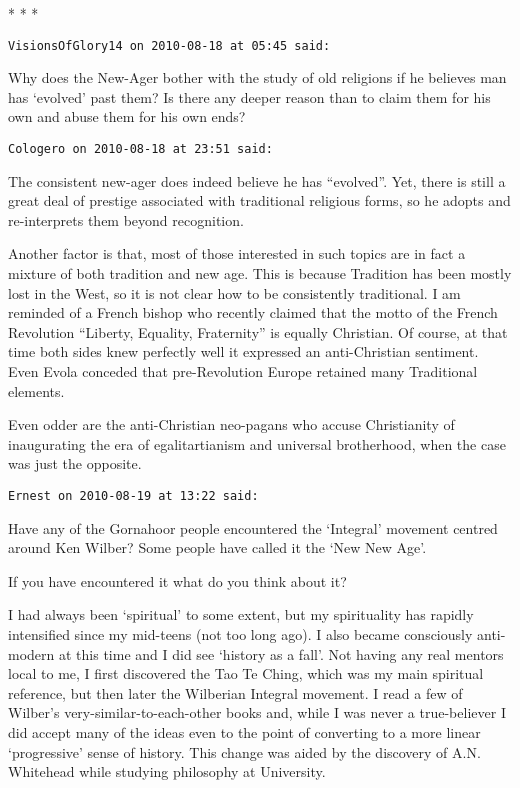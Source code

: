 \begin{center}* * *\end{center}

\begin{footnotesize}\begin{sffamily}

\texttt{VisionsOfGlory14 on 2010-08-18 at 05:45 said: }

Why does the New-Ager bother with the study of old religions if he believes man has ‘evolved’
past them? Is there any deeper reason than to claim them for his own and abuse them for his own ends?


\hfill

\texttt{Cologero on 2010-08-18 at 23:51 said: }

The consistent new-ager does indeed believe he has “evolved”. Yet, there is still a great deal of prestige associated
with traditional religious forms, so he adopts and re-interprets them beyond recognition.

Another factor is that, most of those interested in such topics are in fact a mixture of both tradition and new age.
This is because Tradition has been mostly lost in the West, so it is not clear how to be consistently traditional. I am
reminded of a French bishop who recently claimed that the motto of the French Revolution “Liberty, Equality,
Fraternity” is equally Christian. Of course, at that time both sides knew perfectly well it expressed an anti-Christian
sentiment. Even Evola conceded that pre-Revolution Europe retained many Traditional elements.

Even odder are the anti-Christian neo-pagans who accuse Christianity of inaugurating the era of egalitartianism and
universal brotherhood, when the case was just the opposite.


\hfill

\texttt{Ernest on 2010-08-19 at 13:22 said: }

Have any of the Gornahoor people encountered the ‘Integral’ movement centred around Ken Wilber?
Some people have called it the ‘New New Age’. 

If you have encountered it what do you think about it?

I had always been ‘spiritual’ to some extent, but my spirituality has rapidly intensified since
my mid-teens (not too long ago). I also became consciously anti-modern at this time and I did see ‘history
as a fall’. Not having any real mentors local to me, I first discovered the Tao Te Ching, which was my main
spiritual reference, but then later the Wilberian Integral movement. I read a few of Wilber's
very-similar-to-each-other books and, while I was never a true-believer I did accept many of the ideas even to the
point of converting to a more linear ‘progressive’ sense of history. This change was aided by
the discovery of A.N. Whitehead while studying philosophy at University.


\end{sffamily}
\end{footnotesize}
